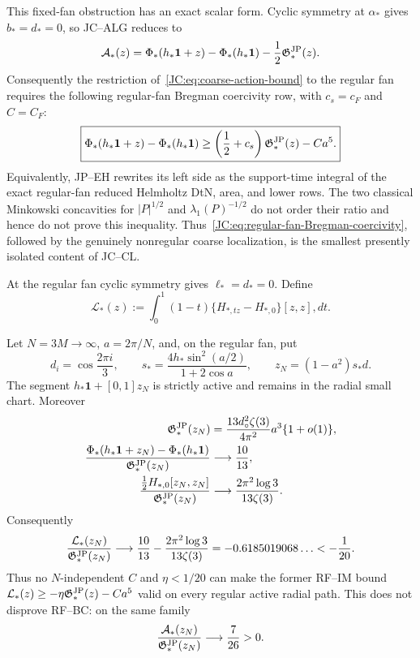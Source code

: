 \begin{contract}
This fixed-fan obstruction has an exact scalar form.  Cyclic symmetry at
$\alpha_*$ gives $b_*=d_*=0$, so JC--ALG reduces to
\[
 \mathcal{A}_*(z)=
 \Phi_*(h_*\mathbf1+z)-\Phi_*(h_*\mathbf1)
 -\frac12\mathfrak G^{\rm JP}_*(z).
\]
Consequently the restriction of~\eqref{JC:eq:coarse-action-bound} to the
regular fan requires the following regular-fan Bregman coercivity row,
with $c_s=c_F$ and $C=C_F$:
\begin{equation}\label{JC:eq:regular-fan-Bregman-coercivity}
 \boxed{
 \Phi_*(h_*\mathbf1+z)-\Phi_*(h_*\mathbf1)
 \ge\left(\frac12+c_s\right)\mathfrak G^{\rm JP}_*(z)-Ca^5.}
\end{equation}
Equivalently, JP--EH rewrites its left side as the support-time integral
of the exact regular-fan reduced Helmholtz DtN, area, and lower rows.  The
two classical Minkowski concavities for $|P|^{1/2}$ and
$\lambda_1(P)^{-1/2}$ do not order their ratio and hence do not prove this
inequality.  Thus~\eqref{JC:eq:regular-fan-Bregman-coercivity}, followed by
the genuinely nonregular coarse localization, is the smallest presently
isolated content of JC--CL.

At the regular fan cyclic symmetry gives $\ell_*=d_*=0$.  Define
\begin{equation}\label{JC:eq:regular-fan-integrated-modulus}
 \mathcal L_*(z):=\int_0^1(1-t)
 \{H_{*,tz}-H_{*,0}\}[z,z],dt.
\end{equation}

\begin{proposition}
\label{JC:prop:RF-IM-period-three-counterexample}
Let \(N=3M\to\infty\), \(a=2\pi/N\), and, on the regular fan, put
\[
 d_i=\cos\frac{2\pi i}{3},\qquad
 s_*=\frac{4h_*\sin^2(a/2)}{1+2\cos a},\qquad
 z_N=(1-a^2)s_*d.
\]
The segment \(h_*\mathbf1+[0,1]z_N\) is strictly active and remains in
the radial small chart.  Moreover
\begin{align}
 \mathfrak G^{\rm JP}_*(z_N)
 &=\frac{13d_\circ^2\zeta(3)}{4\pi^2}a^3\{1+o(1)\},
 \label{JC:eq:RF-counterexample-G}\\
 \frac{\Phi_*(h_*\mathbf1+z_N)-\Phi_*(h_*\mathbf1)}
 {\mathfrak G^{\rm JP}_*(z_N)}
 &\longrightarrow\frac{10}{13},
 \label{JC:eq:RF-counterexample-value}\\
 \frac{\frac12H_{*,0}[z_N,z_N]}{\mathfrak G^{\rm JP}_*(z_N)}
 &\longrightarrow\frac{2\pi^2\log3}{13\zeta(3)}.
 \label{JC:eq:RF-counterexample-root}
\end{align}
Consequently
\begin{equation}\label{JC:eq:regular-fan-integrated-modulus-disproved}
 \frac{\mathcal L_*(z_N)}{\mathfrak G^{\rm JP}_*(z_N)}
 \longrightarrow
 \frac{10}{13}-\frac{2\pi^2\log3}{13\zeta(3)}
 =-0.6185019068\ldots<-\frac1{20}.
\end{equation}
Thus no \(N\)-independent \(C\) and \(\eta<1/20\) can make the former
RF--IM bound
\(\mathcal L_*(z)\ge-\eta\mathfrak G^{\rm JP}_*(z)-Ca^5\) valid on every regular active
radial path.  This does not disprove RF--BC: on the same family
\begin{equation}\label{JC:eq:RF-counterexample-action}
 \frac{\mathcal{A}_*(z_N)}{\mathfrak G^{\rm JP}_*(z_N)}
 \longrightarrow\frac7{26}>0.
\end{equation}
\end{proposition}


\end{contract}
